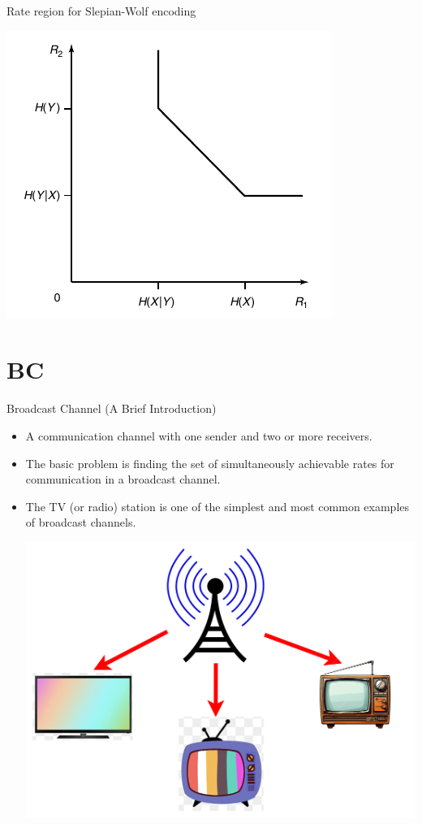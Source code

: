 \documentclass{beamer}
\begin{document}
{%
\begin{frame}{Rate region for Slepian-Wolf encoding}
 \begin{center}
     \includegraphics[scale=0.45]{Diagrams/SWE.png}
 \end{center}
\end{frame}

\section{BC}
\begin{frame}{Broadcast Channel (A Brief Introduction)}
 \begin{itemize}
	\justifying

\item<1-> A communication channel with one sender and two or more receivers.

\item<2-> The basic problem is finding the set of simultaneously achievable rates for communication in a broadcast channel.

\item<3-> The TV (or radio) station is one of the simplest and most common examples of broadcast channels.
\begin{center}
    \includegraphics[scale=0.05]{Presentation Diagrams/TVBC.png}
\end{center}
%


\end{itemize}
\end{frame}}
\end{document}
